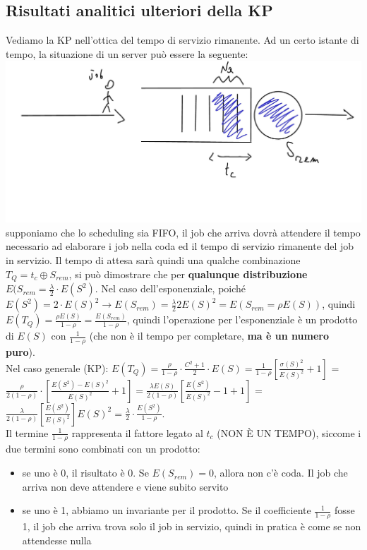 \documentclass{article}
\begin{document}
\subsection{Risultati analitici ulteriori della KP}
Vediamo la KP nell'ottica del tempo di servizio rimanente. Ad un certo istante di tempo, la situazione di un server può essere la seguente:\\
\includegraphics[scale=0.4]{images/PMCSN-1603.jpeg}\\
supponiamo che lo scheduling sia FIFO, il job che arriva dovrà attendere il tempo necessario ad elaborare i job nella coda ed il tempo di servizio rimanente del job in servizio. Il tempo di attesa sarà quindi una qualche combinazione $T_Q = t_c \oplus S_{rem}$, si può dimostrare che per \textbf{qualunque distribuzione} $E(S_{rem} = \frac{\lambda}{2}\cdot E(S^2)$. Nel caso dell'esponenziale, poiché $E(S^2) = 2\cdot E(S)^2 \rightarrow E(S_{rem}) = \frac{\lambda}{2}2E(S)^2 = E(S_{rem} = \rho E(S))$, quindi $E(T_Q) = \frac{\rho E(S)}{1 - \rho} = \frac{E(S_{rem})}{1 - \rho}$, quindi l'operazione per l'esponenziale è un prodotto di $E(S)$ con $\frac{1}{1 - \rho}$ (che non è il tempo per completare, \textbf{ma è un numero puro}).\\ Nel caso generale (KP): $E(T_Q) = \frac{\rho}{1 - \rho} \cdot \frac{C^2 + 1}{2}\cdot E(S) = \frac{1}{1 - \rho} [\frac{\sigma(S)^2}{E(S)^2} + 1]$ = $\frac{\rho}{2(1 - \rho)}\cdot[\frac{E(S^2) - E(S)^2}{E(S)^2} + 1] = \frac{\lambda E(S)}{2(1 - \rho)}[\frac{E(S^2)}{E(S)^2} - 1 + 1]$ = $\frac{\lambda}{2(1 - \rho)}[\frac{E(S^2)}{E(S)^2}]E(S)^2 = \frac{\lambda}{2}\cdot \frac{E(S^2)}{1 - \rho}$.\\ Il termine $\frac{1}{1 - \rho}$ rappresenta il fattore legato al $t_c$ (NON È UN TEMPO), siccome i due termini sono combinati con un prodotto:
\begin{itemize}
\item se uno è 0, il risultato è 0. Se $E(S_{rem}) = 0$, allora non c'è coda. Il job che arriva non deve attendere e viene subito servito
\item se uno è 1, abbiamo un invariante per il prodotto. Se il coefficiente $\frac{1}{1 - \rho}$ fosse 1, il job che arriva trova solo il job in servizio, quindi in pratica è come se non attendesse nulla
\end{itemize}
\end{document}
